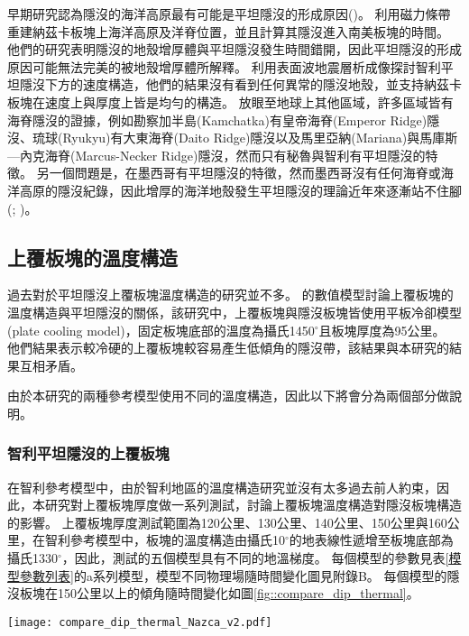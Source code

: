 早期研究認為隱沒的海洋高原最有可能是平坦隱沒的形成原因(\citealp{gutscher2002andean})。
\citet{Skinner2013}利用磁力條帶重建納茲卡板塊上海洋高原及洋脊位置，並且計算其隱沒進入南美板塊的時間。
他們的研究表明隱沒的地殼增厚體與平坦隱沒發生時間錯開，因此平坦隱沒的形成原因可能無法完美的被地殼增厚體所解釋。
\citet{Marot2014}利用表面波地震層析成像探討智利平坦隱沒下方的速度構造，他們的結果沒有看到任何異常的隱沒地殼，並支持納茲卡板塊在速度上與厚度上皆是均勻的構造。
放眼至地球上其他區域，許多區域皆有海脊隱沒的證據，例如勘察加半島(Kamchatka)有皇帝海脊(Emperor Ridge)隱沒、琉球(Ryukyu)有大東海脊(Daito Ridge)隱沒以及馬里亞納(Mariana)與馬庫斯—內克海脊(Marcus-Necker Ridge)隱沒，然而只有秘魯與智利有平坦隱沒的特徵。
另一個問題是，在墨西哥有平坦隱沒的特徵，然而墨西哥沒有任何海脊或海洋高原的隱沒紀錄，因此增厚的海洋地殼發生平坦隱沒的理論近年來逐漸站不住腳(\citealp{schellart2020control}; \citealp{Schellart2021})。

\subsection{上覆板塊的溫度構造}
過去對於平坦隱沒上覆板塊溫度構造的研究並不多。
\citet{Thermal2012}的數值模型討論上覆板塊的溫度構造與平坦隱沒的關係，該研究中，上覆板塊與隱沒板塊皆使用平板冷卻模型(plate cooling model)，固定板塊底部的溫度為攝氏1450$^\circ$且板塊厚度為95公里。
他們結果表示較冷硬的上覆板塊較容易產生低傾角的隱沒帶，該結果與本研究的結果互相矛盾。

由於本研究的兩種參考模型使用不同的溫度構造，因此以下將會分為兩個部分做說明。

\subsubsection{智利平坦隱沒的上覆板塊}
在智利參考模型中，由於智利地區的溫度構造研究並沒有太多過去前人約束，因此，本研究對上覆板塊厚度做一系列測試，討論上覆板塊溫度構造對隱沒板塊構造的影響。
上覆板塊厚度測試範圍為120公里、130公里、140公里、150公里與160公里，在智利參考模型中，板塊的溫度構造由攝氏10$^\circ$的地表線性遞增至板塊底部為攝氏1330$^\circ$，因此，測試的五個模型具有不同的地溫梯度。
每個模型的參數見表\ref{模型參數列表}的a系列模型，模型不同物理場隨時間變化圖見附錄B。
每個模型的隱沒板塊在150公里以上的傾角隨時間變化如圖\ref{fig::compare_dip_thermal}。

\begin{figure*}[ht!]
    \centering
    \texttt{[image: compare\_dip\_thermal\_Nazca\_v2.pdf]}
    \caption[測試上覆板塊厚度模型之150公里以上隱沒傾角隨時間變化]{測試上覆板塊厚度模型之150公里以上隱沒傾角隨時間變化。}
    \label{fig::compare_dip_thermal}
\end{figure*}

